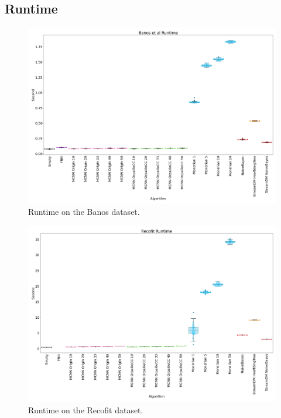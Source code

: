 \subsection{Runtime}
\begin{figure}[H]
	\includegraphics[width=\linewidth]{figures/results/banos_runtime.png}
	\caption{Runtime on the Banos dataset.}
\end{figure}
\begin{figure}[H]
	\includegraphics[width=\linewidth]{figures/results/recofit_runtime.png}
	\caption{Runtime on the Recofit dataset.}
\end{figure}

